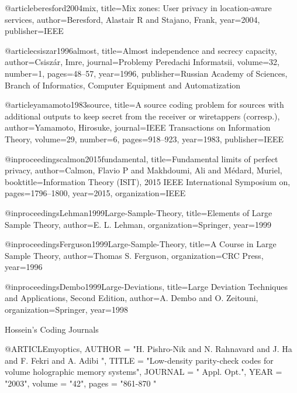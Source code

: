 {{{{{{{{@article{beresford2004mix,
  title={Mix zones: User privacy in location-aware services},
  author={Beresford, Alastair R and Stajano, Frank},
  year={2004},
  publisher={IEEE}
}


@article{csiszar1996almost,
  title={Almost independence and secrecy capacity},
  author={Csisz{\'a}r, Imre},
  journal={Problemy Peredachi Informatsii},
  volume={32},
  number={1},
  pages={48--57},
  year={1996},
  publisher={Russian Academy of Sciences, Branch of Informatics, Computer Equipment and Automatization}
}

@article{yamamoto1983source,
  title={A source coding problem for sources with additional outputs to keep secret from the receiver or wiretappers (corresp.)},
  author={Yamamoto, Hirosuke},
  journal={IEEE Transactions on Information Theory},
  volume={29},
  number={6},
  pages={918--923},
  year={1983},
  publisher={IEEE}
}


@inproceedings{calmon2015fundamental,
  title={Fundamental limits of perfect privacy},
  author={Calmon, Flavio P and Makhdoumi, Ali and M{\'e}dard, Muriel},
  booktitle={Information Theory (ISIT), 2015 IEEE International Symposium on},
  pages={1796--1800},
  year={2015},
  organization={IEEE}
}



@inproceedings{Lehman1999Large-Sample-Theory,
	title={Elements of Large Sample Theory},
	author={E. L. Lehman},
	organization={Springer},
	year={1999}
}


@inproceedings{Ferguson1999Large-Sample-Theory,
	title={A Course in Large Sample Theory},
	author={Thomas S. Ferguson},
	organization={CRC Press},
	year={1996}
}



@inproceedings{Dembo1999Large-Deviations,
	title={Large Deviation Techniques and Applications, Second Edition},
	author={A. Dembo and O. Zeitouni},
	organization={Springer},
	year={1998}
}


Hossein's Coding Journals

@ARTICLE{myoptics,
  AUTHOR =       "H. Pishro-Nik and N. Rahnavard and J. Ha and F. Fekri and A. Adibi ",
  TITLE =        "Low-density parity-check codes for volume holographic memory systems",
  JOURNAL =      " Appl. Opt.",
  YEAR =         "2003",
  volume =       "42",
  pages =        "861-870  "
 }






}}}}}}}}

